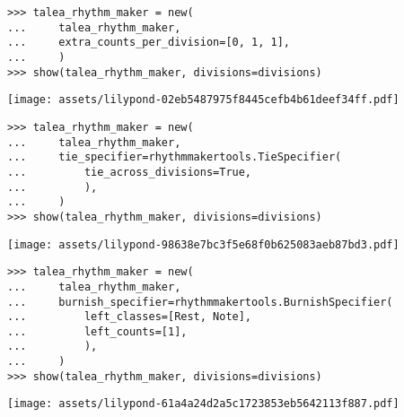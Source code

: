 \begin{comment}
<abjad>
talea_rhythm_maker = new(
    talea_rhythm_maker,
    extra_counts_per_division=[0, 1, 1],
    )
show(talea_rhythm_maker, divisions=divisions)
</abjad>
\end{comment}

\begin{singlespacing}
\vspace{-0.5\baselineskip}
\begin{lstlisting}
>>> talea_rhythm_maker = new(
...     talea_rhythm_maker,
...     extra_counts_per_division=[0, 1, 1],
...     )
>>> show(talea_rhythm_maker, divisions=divisions)
\end{lstlisting}
\noindent\texttt{[image: assets/lilypond-02eb5487975f8445cefb4b61deef34ff.pdf]}
\end{singlespacing}

\begin{comment}
<abjad>
talea_rhythm_maker = new(
    talea_rhythm_maker,
    tie_specifier=rhythmmakertools.TieSpecifier(
        tie_across_divisions=True,
        ),
    )
show(talea_rhythm_maker, divisions=divisions)
</abjad>
\end{comment}

\begin{singlespacing}
\vspace{-0.5\baselineskip}
\begin{lstlisting}
>>> talea_rhythm_maker = new(
...     talea_rhythm_maker,
...     tie_specifier=rhythmmakertools.TieSpecifier(
...         tie_across_divisions=True,
...         ),
...     )
>>> show(talea_rhythm_maker, divisions=divisions)
\end{lstlisting}
\noindent\texttt{[image: assets/lilypond-98638e7bc3f5e68f0b625083aeb87bd3.pdf]}
\end{singlespacing}

\begin{comment}
<abjad>
talea_rhythm_maker = new(
    talea_rhythm_maker,
    burnish_specifier=rhythmmakertools.BurnishSpecifier(
        left_classes=[Rest, Note],
        left_counts=[1],
        ),
    )
show(talea_rhythm_maker, divisions=divisions)
</abjad>
\end{comment}

\begin{singlespacing}
\vspace{-0.5\baselineskip}
\begin{lstlisting}
>>> talea_rhythm_maker = new(
...     talea_rhythm_maker,
...     burnish_specifier=rhythmmakertools.BurnishSpecifier(
...         left_classes=[Rest, Note],
...         left_counts=[1],
...         ),
...     )
>>> show(talea_rhythm_maker, divisions=divisions)
\end{lstlisting}
\noindent\texttt{[image: assets/lilypond-61a4a24d2a5c1723853eb5642113f887.pdf]}
\end{singlespacing}


